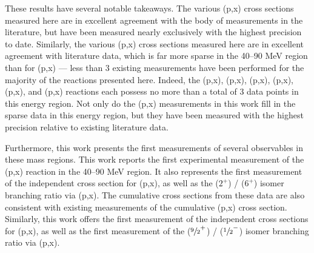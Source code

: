 \documentclass[%
 reprint,
superscriptaddress,
onecolumn,
linenumbers,
notitlepage,
 amsmath,amssymb,
 aps,
prc,
]{revtex4-1}
\begin{document}
These results have several notable takeaways.
The various (p,x) cross sections measured here are in excellent agreement with the body of measurements in the literature,  but have been measured nearly exclusively with the highest precision to date.
Similarly, the various (p,x) cross sections measured here are in excellent agreement with literature data, which is far more sparse in the 40--90 MeV region than for (p,x) ---  less than 3 existing measurements have been performed for the majority of the reactions presented here.
Indeed,  the (p,x), (p,x), (p,x), (p,x), (p,x), and (p,x) reactions each possess no more than a total of 3 data points in this energy region.
Not only do the (p,x) measurements in this work fill in the sparse data in this energy region, but they have been measured with the highest precision relative to existing literature data.



Furthermore, this work presents the first measurements of several observables in these mass regions.
This work reports the first experimental measurement of the (p,x) reaction in the 40--90 MeV region.
It also represents  the first measurement of the independent cross section for       (p,x), as well as the  ($2^+$) /   ($6^+$)  isomer branching ratio via (p,x).  
The cumulative cross sections from these data are also consistent with existing measurements of the cumulative (p,x) cross section.
Similarly, this work offers the first measurement of the independent cross sections for (p,x),  as well as the first measurement of the      ($\sfrac{9}{2}^+$) /   ($\sfrac{1}{2}^-$) isomer branching ratio via (p,x).
\end{document}
